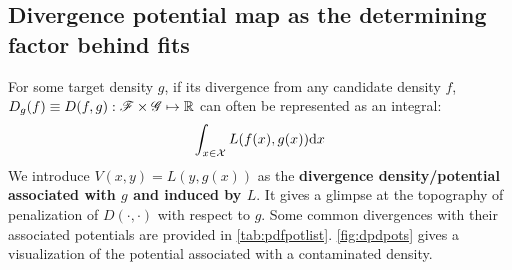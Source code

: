 \subsection{Divergence potential map as the determining factor behind fits}
For some target density $g$, if its divergence from any candidate density $f$, $D_g(f) \equiv D(f,g): \mathscr F \times \mathscr G \mapsto \mathbb R$ can often be represented as an integral:
\[\int_{x \in \mathcal X} L(f(x),g(x)) \mathrm d x\]
We introduce $V(x,y) = L(y, g(x))$ as the \textbf{divergence density/potential associated with $g$ and induced by $L$}. It gives a glimpse at the topography of penalization of $D(\cdot, \cdot)$ with respect to $g$. Some common divergences with their associated potentials are provided in \autoref{tab:pdfpotlist}. \autoref{fig:dpdpots} gives a visualization of the potential associated with a contaminated density.


